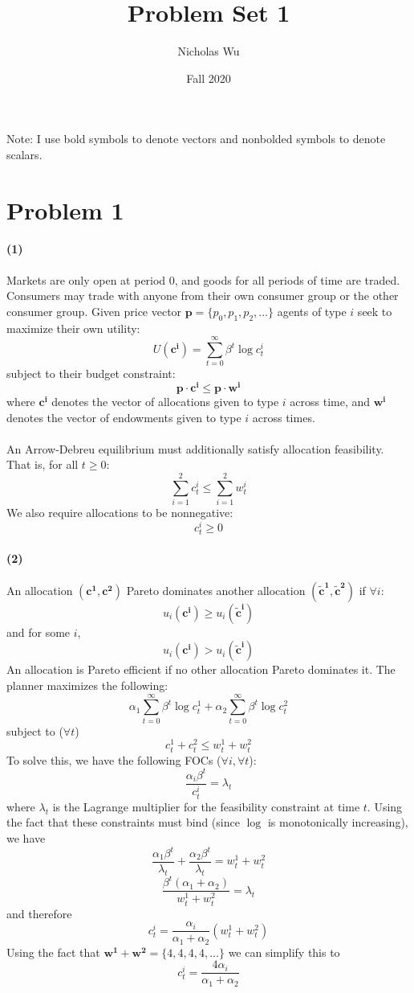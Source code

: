 \documentclass[10pt,letter]{article}
\renewcommand{\vector}[1]{\boldsymbol{#1}}
\newcommand{\problem}[1]{\section*{Problem #1}}
\newcommand{\problempart}[1]{\paragraph{#1}}
\begin{document}


\title{Problem Set 1}

\author{Nicholas Wu}

\date{Fall 2020}

\maketitle
Note: I use bold symbols to denote vectors and nonbolded symbols to denote scalars.

\problem{1}

\problempart{(1)} Markets are only open at period 0, and goods for all periods of time are traded. Consumers may trade with anyone from their own consumer group or the other consumer group. Given price vector $\vector{p} = \{p_0, p_1, p_2, ... \}$ agents of type $i$ seek to maximize their own utility:
\[ U(\vector{c^i}) = \sum_{t=0}^\infty \beta^t \log c^i_t \]
 subject to their budget constraint:
\[ \vector{p}\cdot \vector{c^i} \le \vector{p}\cdot \vector{w^i} \]
where $\vector{c^i}$ denotes the vector of allocations given to type $i$ across time, and $\vector{w^i}$ denotes the vector of endowments given to type $i$ across times. \\\\
An Arrow-Debreu equilibrium must additionally satisfy allocation feasibility. That is, for all $t \ge 0$:
\[ \sum_{i=1}^2 c^i_t \le \sum_{i=1}^2 w^i_t \]
We also require allocations to be nonnegative:
\[ c^i_t \ge 0 \]
\problempart{(2)}
An allocation $(\vector{c^1}, \vector{c^2} )$ Pareto dominates another allocation $(\vector{\tilde{c}^1},\vector{\tilde{c}^2})$ if $\forall i$:
\[ u_i(\vector{c^i}) \ge u_i(\vector{\tilde{c}^i}) \]
and for some $i$,
\[ u_i(\vector{c^i}) > u_i(\vector{\tilde{c}^i}) \]
An allocation is Pareto efficient if no other allocation Pareto dominates it. The planner maximizes the following:
\[ \alpha_1 \sum_{t=0}^\infty \beta^t \log c^1_t + \alpha_2 \sum_{t=0}^\infty \beta^t \log c^2_t  \]
subject to ($\forall t$)
\[ c^1_t + c^2_t \le w^1_t + w^2_t \]
To solve this, we have the following FOCs ($\forall i, \forall t$):
\[ \frac{\alpha_i \beta^t}{c^i_t} = \lambda_{t}  \]
where $\lambda_t$ is the Lagrange multiplier for the feasibility constraint at time $t$. Using the fact that these constraints must bind (since $\log$ is monotonically increasing), we have
\[ \frac{\alpha_1 \beta^t}{\lambda_{t}} + \frac{\alpha_2 \beta^t}{\lambda_t} = w^1_t + w^2_t \]
\[ \frac{\beta^t(\alpha_1 + \alpha_2)}{w^1_t + w^2_t} = \lambda_t \]
and therefore
\[ c^i_t = \frac{\alpha_i}{\alpha_1 + \alpha_2}(w^1_t + w^2_t) \]
Using the fact that
$ \vector{w^1} + \vector{w^2} = \{4, 4, 4, 4, \dots\} $
we can simplify this to
\[ c^i_t = \frac{4\alpha_i}{\alpha_1 + \alpha_2}\]
\end{document}
